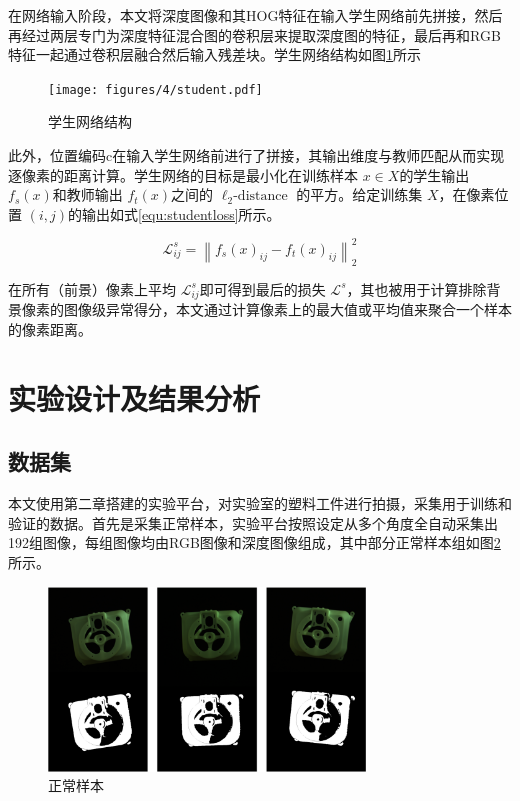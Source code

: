 在网络输入阶段，本文将深度图像和其HOG特征在输入学生网络前先拼接，然后再经过两层专门为深度特征混合图的卷积层来提取深度图的特征，最后再和RGB特征一起通过卷积层融合然后输入残差块。学生网络结构如图\ref{fig:student}所示
\begin{figure}[htbp]
    \centering
    \texttt{[image: figures/4/student.pdf]}
    \caption{学生网络结构}
    \label{fig:student}
\end{figure}

此外，位置编码c在输入学生网络前进行了拼接，其输出维度与教师匹配从而实现逐像素的距离计算。学生网络的目标是最小化在训练样本 $x \in X$的学生输出 $f_{s}(x)$和教师输出 $f_{t}(x)$之间的  $\ell_{2} \text {-distance }$的平方。给定训练集 $X$，在像素位置 $(i,j)$的输出如式\ref{equ:studentloss}所示。

\begin{equation}\label{equ:studentloss}
    \mathcal{L}_{i j}^{s}=\left\|f_{s}(x)_{i j}-f_{t}(x)_{i j}\right\|_{2}^{2}   
\end{equation}


在所有（前景）像素上平均 $\mathcal{L}_{i j}^{s}$即可得到最后的损失 $\mathcal{L}^{s}$，其也被用于计算排除背景像素的图像级异常得分，本文通过计算像素上的最大值或平均值来聚合一个样本的像素距离。
\section{实验设计及结果分析}
\subsection{数据集}
本文使用第二章搭建的实验平台，对实验室的塑料工件进行拍摄，采集用于训练和验证的数据。首先是采集正常样本，实验平台按照设定从多个角度全自动采集出192组图像，每组图像均由RGB图像和深度图像组成，其中部分正常样本组如图\ref{fig:normal-smaple}所示。
\begin{figure}[htbp]
    \centering
    \includegraphics[width=0.75\textwidth]{figures/4/normal-smaple.png}
    \caption{正常样本}
    \label{fig:normal-smaple}
\end{figure}

